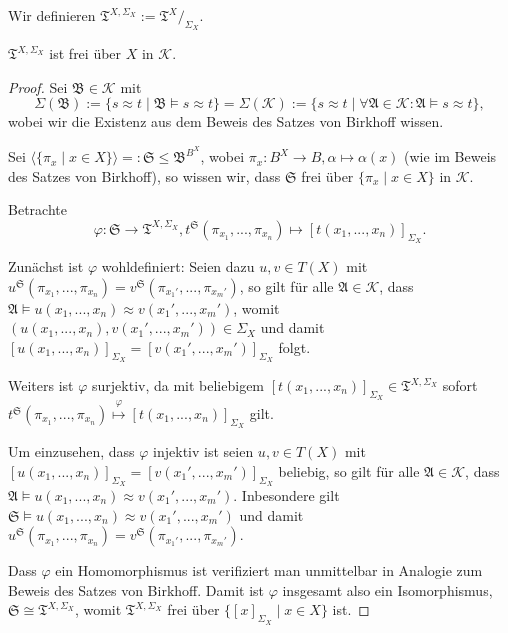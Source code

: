 \begin{definition}
    Wir definieren $ \mathfrak{T}^{X, \Sigma_X} := \mathfrak{T}^X /_{\Sigma_X}$.
\end{definition}

\begin{theorem}\label{theorem:freie_faktoralgebra}
    $\mathfrak{T}^{X, \Sigma_X}$ ist frei über $X$ in $\mathcal{K}$.
\end{theorem}

\begin{proof}
    Sei $\mathfrak{B} \in \mathcal{K}$ mit
    $$ \Sigma(\mathfrak{B}) := \{ s \approx t \mid \mathfrak{B} \models s \approx t \} = \Sigma(\mathcal{K}) := \{ s \approx t \mid \forall \mathfrak{A} \in \mathcal{K}: \mathfrak{A} \models s \approx t \}, $$
    wobei wir die Existenz aus dem Beweis des Satzes von Birkhoff wissen.
    
    Sei $\langle \{ \pi_x \mid x \in X \} \rangle =: \mathfrak{S} \leq \mathfrak{B}^{B^X}$, wobei $\pi_x : B^X \to B, \alpha \mapsto \alpha(x)$ (wie im Beweis des Satzes von Birkhoff), so wissen wir, dass $\mathfrak{S}$ frei über $\{ \pi_x \mid x \in X \}$ in $\mathcal{K}$.

    Betrachte
    $$ \varphi: \mathfrak{S} \to \mathfrak{T}^{X, \Sigma_X}, t^\mathfrak{S} (\pi_{x_1}, ..., \pi_{x_n}) \mapsto [t(x_1,...,x_n)]_{\Sigma_X}. $$

    Zunächst ist $\varphi$ wohldefiniert: Seien dazu $u, v \in T(X)$ mit $u^\mathfrak{S} (\pi_{x_1}, ..., \pi_{x_n}) = v^\mathfrak{S}(\pi_{x_1'}, ..., \pi_{x_m'})$, so gilt für alle $\mathfrak{A} \in \mathcal{K}$, dass $\mathfrak{A} \models u(x_1, ..., x_n) \approx v(x_1', ..., x_m')$, womit $(u(x_1, ..., x_n), v(x_1', ..., x_m')) \in \Sigma_X$ und damit $[u(x_1, ..., x_n)]_{\Sigma_X} = [v(x_1', ..., x_m')]_{\Sigma_X}$ folgt.

    Weiters ist $\varphi$ surjektiv, da mit beliebigem $[t(x_1,...,x_n)]_{\Sigma_X} \in \mathfrak{T}^{X, \Sigma_X}$ sofort \\ $t^\mathfrak{S}(\pi_{x_1}, ..., \pi_{x_n}) \overset{\varphi}{\mapsto} [t(x_1,...,x_n)]_{\Sigma_X}$ gilt.

    Um einzusehen, dass $\varphi$ injektiv ist seien $u, v \in T(X)$ mit $[u(x_1, ..., x_n)]_{\Sigma_X} = [v(x_1', ..., x_m')]_{\Sigma_X}$ beliebig, so gilt für alle $\mathfrak{A} \in \mathcal{K}$, dass $\mathfrak{A} \models u(x_1, ..., x_n) \approx v(x_1', ..., x_m')$. Inbesondere gilt $\mathfrak{S} \models u(x_1, ..., x_n) \approx v(x_1', ..., x_m')$ und damit $u^\mathfrak{S}(\pi_{x_1}, ..., \pi_{x_n}) = v^\mathfrak{S}(\pi_{x_1'}, ..., \pi_{x_m'})$.

    Dass $\varphi$ ein Homomorphismus ist verifiziert man unmittelbar in Analogie zum Beweis des Satzes von Birkhoff. Damit ist $\varphi$ insgesamt also ein Isomorphismus, $\mathfrak{S} \cong \mathfrak{T}^{X, \Sigma_X}$, womit $\mathfrak{T}^{X, \Sigma_X}$ frei über $\{ [x]_{\Sigma_X} \mid x \in X \}$ ist.
\end{proof}

